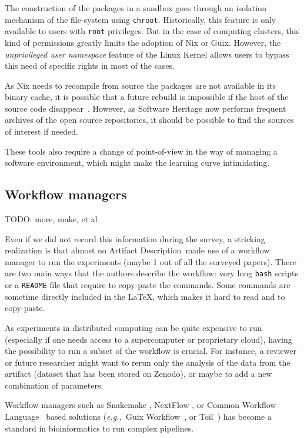 \documentclass[sigconf,natbib=false]{acmart}
\newcommand{\eg}{\emph{e.g.,}}
\newcommand{\ad}{Artifact Description}
\newcommand{\todo}[1]{{\color{red}TODO: #1}}
\begin{document}
The construction of the packages in a sandbox goes through an isolation mechanism of the file-system using \texttt{chroot}.
Historically, this feature is only available to users with \texttt{root} privileges.
But in the case of computing clusters, this kind of permissions greatly limits the adoption of Nix or Guix.
However, the \emph{unprivileged user namespace} feature of the Linux Kernel allows users to bypass this need of specific rights in most of the cases.

As Nix needs to recompile from source the packages are not available in its binary cache, it is possible that a future rebuild is impossible if the host of the source code disappear\ \cite{blinry}.
However, as Software Heritage now performs frequent archives of the open source repositories, it should be possible to find the sources of interest if needed.

These tools also require a change of point-of-view in the way of managing a software environment, which might make the learning curve intimidating.


\subsection{Workflow managers}\label{sec:sop:workflow}

\todo{more, make, et al}

Even if we did not record this information during the survey, a stricking realization is that almost no \ad\ made use of a workflow manager to run the experiments (maybe 1 out of all the  surveyed papers).
There are two main ways that the authors describe the workflow: very long \texttt{bash} scripts or a \texttt{README} file that require to copy-paste the commands.
Some commands are sometime directly included in the LaTeX, which makes it hard to read and to copy-paste.

As experiments in distributed computing can be quite expensive to run (especially if one needs access to a supercomputer or proprietary cloud), having the possibility to run a subset of the workflow is crucial.
For instance, a reviewer or future researcher might want to rerun only the analysis of the data from the artifact (dataset that has been stored on Zenodo), or maybe to add a new combination of parameters. 

Workflow managers \cite{wratten2021reproducible} such as Snakemake \cite{koster2012snakemake}, NextFlow \cite{di2017nextflow}, or Common Workflow Language\ \cite{amstutz2016common} based solutions (\eg\ Guix Workflow\ \cite{strozzi2019scalable}, or Toil\ \cite{vivian2017toil}) has become a standard in bioinformatics to run complex pipelines.
\end{document}
